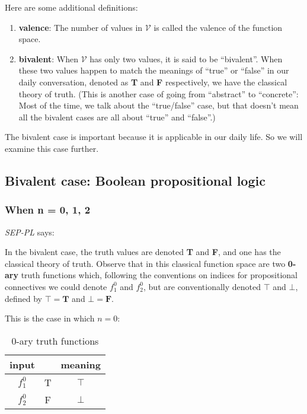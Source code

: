 \documentclass[12pt, letterpaper]{article}
\begin{document}
Here are some additional definitions:
\begin{enumerate}
  \item \textbf{valence}: The number of values in $\mathcal{V}$ is called the
    valence of the function space.
  \item \textbf{bivalent}: When $\mathcal{V}$ has only two values, it is said
    to be ``bivalent''. When these two values happen to match the meanings of
    ``true'' or ``false'' in our daily conversation, denoted as \textbf{T} and
    \textbf{F} respectively, we have the classical theory of truth. (This is
    another case of going from ``abstract'' to ``concrete'': Most of the time,
    we talk about the ``true/false'' case, but that doesn't mean all the
    bivalent cases are all about ``true'' and ``false''.)
\end{enumerate}

The bivalent case is important because it is applicable in our daily life. So
we will examine this case further.

\subsection{Bivalent case: Boolean propositional logic}

\subsubsection{When n = 0, 1, 2}

\textit{SEP-PL} says:

\begin{displayquote}
  In the bivalent case, the truth values are denoted \textbf{T} and \textbf{F},
  and one has the classical theory of truth. Observe that in this classical
  function space are two \textbf{0-ary} truth functions which, following the
  conventions on indices for propositional connectives we could denote $f_1^0$
  and $f_2^0$, but are conventionally denoted $\top$ and $\bot$, defined by
  $\top = \textbf{T}$ and $\bot = \textbf{F}$.
\end{displayquote}

This is the case in which $n = 0$:

\begin{table}[H]
  \centering
  \begin{tabular}{|c|c|c|}
  \hline
  input   &   & meaning \\ [1ex] \hline
  $f_1^0$ & T & $\top$  \\ [0.5ex] \hline
  $f_2^0$ & F & $\bot$  \\ [0.5ex] \hline
  \end{tabular}
  \caption{0-ary truth functions}
\end{table}
\end{document}
